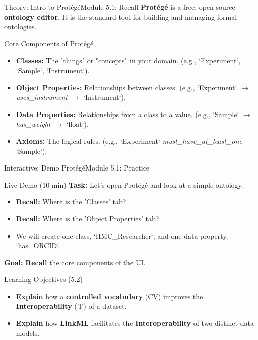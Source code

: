 \begin{frame}{Theory: Intro to Protégé}{Module 5.1: Recall}
    \textbf{Protégé} is a free, open-source \textbf{ontology editor}. It is the standard tool for building and managing formal ontologies.
    
    \begin{block}{Core Components of Protégé}
        \begin{itemize}
            \item \textbf{Classes:} The "things" or "concepts" in your domain. (e.g., `Experiment`, `Sample`, `Instrument`).
            \pause
            \item \textbf{Object Properties:} Relationships between classes. (e.g., `Experiment` $\rightarrow$ \emph{uses\_instrument} $\rightarrow$ `Instrument`).
            \pause
            \item \textbf{Data Properties:} Relationships from a class to a value. (e.g., `Sample` $\rightarrow$ \emph{has\_weight} $\rightarrow$ `float`).
            \pause
            \item \textbf{Axioms:} The logical rules. (e.g., `Experiment` \emph{must\_have\_at\_least\_one} `Sample`).
        \end{itemize}
    \end{block}
\end{frame}

\begin{frame}{Interactive: Demo Protégé}{Module 5.1: Practice}
    \begin{block}{Live Demo (10 min)}
        \textbf{Task:} Let's open Protégé and look at a simple ontology.
        \pause
        \begin{itemize}
            \item \textbf{Recall:} Where is the 'Classes' tab?
            \item \textbf{Recall:} Where is the 'Object Properties' tab?
            \item We will create one class, `HMC\_Researcher`, and one data property, `has\_ORCID`.
        \end{itemize}
        \pause
        \textbf{Goal:} \textbf{Recall} the core components of the UI.
    \end{block}
\end{frame}

\begin{frame}{Learning Objectives (5.2)}
    \begin{itemize}
        \item \textbf{Explain} how a \textbf{controlled vocabulary} (CV) improves the \textbf{Interoperability} ('I') of a dataset.
        \item \textbf{Explain} how \textbf{LinkML} facilitates the \textbf{Interoperability} of two distinct data models.
    \end{itemize}
\end{frame}

